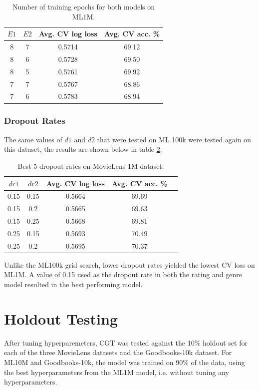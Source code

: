 \begin{table}[H]
\centering
\begin{tabular}{c | c | c | c}
\toprule
\textbf{$E1$} & \textbf{$E2$} & \textbf{Avg. CV log loss} & \textbf{Avg. CV acc.} \% \\
\midrule
8 & 7 & 0.5714 & 69.12 \\
\midrule
8 & 6 & 0.5728 & 69.50 \\
\midrule
8 & 5 & 0.5761 & 69.92 \\
\midrule
7 & 7 & 0.5767 & 68.86 \\
\midrule
7 & 6 & 0.5783 & 68.94 \\
\bottomrule
\end{tabular}
\caption[MovieLens 1M grid search results -- number of epochs]{Number of training epochs for both models on ML1M.}
\label{tab:ml1m-grid-results2}
\end{table}

\subsubsection{Dropout Rates}
The same values of $d1$ and $d2$ that were tested on ML 100k were tested again on this dataset, the results are shown below in table \ref{tab:ml1m-grid-results3}.

\begin{table}[H]
\centering
\begin{tabular}{c | c | c | c | c}
\toprule
\textbf{$dr1$} & \textbf{$dr2$} & \textbf{Avg. CV log loss} & \textbf{Avg. CV acc.} \% \\
\midrule
0.15 & 0.15 & 0.5664 & 69.69 \\
\midrule
0.15 & 0.2 & 0.5665 & 69.63 \\
\midrule
0.15 & 0.25 & 0.5668 & 69.81 \\
\midrule
0.25 & 0.15 & 0.5693 & 70.49 \\
\midrule
0.25 & 0.2 & 0.5695 & 70.37 \\
\bottomrule
\end{tabular}
\caption[MovieLens 1M grid search results -- dropout rates]{Best 5 dropout rates on MovieLens 1M dataset.}
\label{tab:ml1m-grid-results3}
\end{table}

Unlike the ML100k grid search, lower dropout rates yielded the lowest CV loss on ML1M. A value of 0.15 used as the dropout rate in both the rating and genre model resulted in the best performing model.

\section{Holdout Testing}
After tuning hyperparemeters, CGT was tested against the 10\% holdout set for each of the three MovieLens datasets and the Goodbooks-10k dataset. For ML10M and Goodbooks-10k, the model was trained on 90\% of the data, using the best hyperparameters from the ML1M model, i.e. without tuning any hyperparameters.

